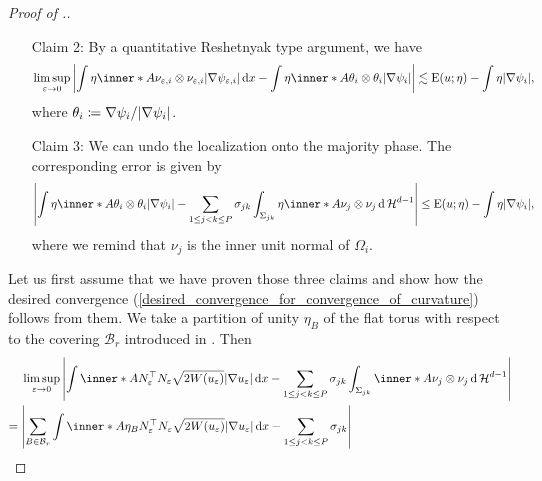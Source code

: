 \begin{proof}[Proof of .]
\begin{itemize}[wide=0pt]
		\item[Claim 2:]
		By a quantitative Reshetnyak type argument, we have
		\begin{equation*}
			\limsup_{ \varepsilon \to 0 }
				\abs{
					\int
						\eta \inner*{ A }{ \nu_{ \varepsilon, i } \otimes \nu_{ 
						\varepsilon,  i } }
						\abs{ \nabla \psi_{ \varepsilon,  i } }
					\dd{ x }
					-
					\int
						\eta \inner*{ A }{ \theta_{ i }  \otimes 
						\theta_{ i } }
					\abs{ \nabla \psi_{ i } }
				}
			\lesssim
				\energy ( u ; \eta ) - \int \eta \abs{ \nabla \psi_{ i } },
		\end{equation*}
		where $ \theta_{ i } \coloneqq \nabla \psi_{ i } / \abs{ \nabla \psi_{ 
		i } } $.
		\item[Claim 3:] 
		We can undo the localization onto the majority phase. The corresponding error is given by
		\begin{equation*}
			\abs{ 
				\int
					\eta
					\inner*{ A }{ \theta_{ i } \otimes \theta_{ i } }
				\abs{ \nabla \psi_{ i } }
				-
				\sum_{ 1 \leq j < k \leq P }
					\sigma_{ j k }
					\int_{ \Sigma_{ j k } }
						\eta 
						\inner*{ A }{ \nu_{ j } \otimes \nu_{ j } }
					\dd{ \hm^{ d - 1 } }
			}
		\leq
		\energy ( u ; \eta ) - \int \eta \abs{ \nabla \psi_{ i } },
		\end{equation*}
		where we remind that $ \nu_{ j } $ is the inner unit normal of $ 
		\Omega_{ i } $.
	\end{itemize}
	Let us first assume that we have proven those three claims and show how the desired convergence (\ref{desired_convergence_for_convergence_of_curvature}) follows from them. 
	We take a partition of unity $ \eta_{ B } $ of the flat torus with respect 
	to the covering $ \mathcal{ B }_{ r } $ introduced in 
	. Then
	\begin{align*}
		& \limsup_{ \varepsilon \to 0 }
			\abs{
				\int
					\inner*{ A }{ N_{ \varepsilon }^{ \top } N_{ \varepsilon } }
					\sqrt{ 2 W ( u_{ \varepsilon } ) }
					\abs{ \nabla u_{ \varepsilon } }
				\dd{ x }
				-
				\sum_{ 1 \leq j < k \leq P }
					\sigma_{ j  k }
				 	\int_{ \Sigma_{ j k } }
				 		\inner*{ A }{ \nu_{ j } \otimes \nu_{ j } }
				 	\dd{ \hm^{ d - 1 } }
			} 
		\\
		={} &
		\abs{ 
			\sum_{ B \in \mathcal{ B }_{ r } }
				\int
					\inner*{ A \eta_{ B } }
					{ N_{ \varepsilon }^{ \top } N_{ \varepsilon } }
					\sqrt{ 2 W ( u_{ \varepsilon } ) } \abs{ \nabla u_{ \varepsilon } }
				\dd{ x }
			-
			\sum_{ 1 \leq j < k \leq P }
				\sigma_{ j k }
}
\end{align*}
\end{proof}
